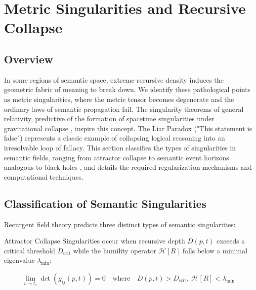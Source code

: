 \chapter{Metric Singularities and Recursive Collapse}
\label{ch:metric_singularities_and_recursive_collapse}


\section{Overview}

In some regions of semantic space, extreme recursive density induces the geometric fabric of meaning to break down. We identify these pathological points as metric singularities, where the metric tensor becomes degenerate and the ordinary laws of semantic propagation fail. The singularity theorems of general relativity, predictive of the formation of spacetime singularities under gravitational collapse \autocite{Penrose1965}, inspire this concept. The Liar Paradox ("This statement is false") represents a classic example of collapsing logical reasoning into an irresolvable loop of fallacy. This section classifies the types of singularities in semantic fields, ranging from attractor collapse to semantic event horizons analogous to black holes \autocite{Hawking1974}, and details the required regularization mechanisms and computational techniques.


\section{Classification of Semantic Singularities}
\label{sec:classification_of_semantic_singularities}

Recurgent field theory predicts three distinct types of semantic singularities:

Attractor Collapse Singularities occur when recursive depth \(D(p, t)\) exceeds a critical threshold \(D_{\text{crit}}\) while the humility operator \(\mathcal{H}[R]\) falls below a minimal eigenvalue \(\lambda_{\text{min}}\):

\begin{equation}
\lim_{t \to t_c} \det(g_{ij}(p, t)) = 0 \quad \text{where} \quad D(p, t) > D_{\text{crit}},\ \mathcal{H}[R] < \lambda_{\text{min}}
\end{equation}

